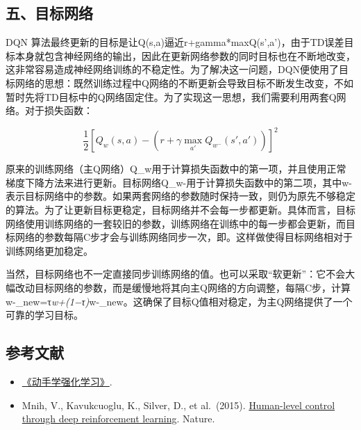 \hypertarget{ux4e94ux76eeux6807ux7f51ux7edc}{%
\subsection{五、目标网络}\label{ux4e94ux76eeux6807ux7f51ux7edc}}

DQN 算法最终更新的目标是让Q(s,a)逼近r+gamma*maxQ(s',a')，由于TD误差目标本身就包含神经网络的输出，因此在更新网络参数的同时目标也在不断地改变，这非常容易造成神经网络训练的不稳定性。为了解决这一问题，DQN便使用了目标网络的思想：既然训练过程中Q网络的不断更新会导致目标不断发生改变，不如暂时先将TD目标中的Q网络固定住。为了实现这一思想，我们需要利用两套Q网络。对于损失函数：

\[
\frac{1}{2}\left[Q_w(s,a)-\left(r+\gamma\max_{a'}Q_{w^-}(s',a')\right)\right]^2
\]

原来的训练网络（主Q网络）Q\_w用于计算损失函数中的第一项，并且使用正常梯度下降方法来进行更新。目标网络Q\_w-用于计算损失函数中的第二项，其中w-表示目标网络中的参数。如果两套网络的参数随时保持一致，则仍为原先不够稳定的算法。为了让更新目标更稳定，目标网络并不会每一步都更新。具体而言，目标网络使用训练网络的一套较旧的参数，训练网络在训练中的每一步都会更新，而目标网络的参数每隔C步才会与训练网络同步一次，即。这样做使得目标网络相对于训练网络更加稳定。

当然，目标网络也不一定直接同步训练网络的值。也可以采取``软更新''：它不会大幅改动目标网络的参数，而是缓慢地将其向主Q网络的方向调整，每隔C步，计算w-\_new=τ\emph{w+(1−τ)}w-\_new。这确保了目标Q值相对稳定，为主Q网络提供了一个可靠的学习目标。

\FloatBarrier
{}
\hypertarget{ux53c2ux8003ux6587ux732e-50}{%
\subsection{参考文献}\label{ux53c2ux8003ux6587ux732e-50}}

\vspace{0.25em}
\begin{itemize}
\tightlist
\item
  \href{https://hrl.boyuai.com/}{《动手学强化学习》}.
\item
  Mnih, V., Kavukcuoglu, K., Silver, D., et al.~(2015). \href{https://www.nature.com/articles/nature14236}{Human-level control through deep reinforcement learning}. Nature.
\end{itemize}

\clearpage
